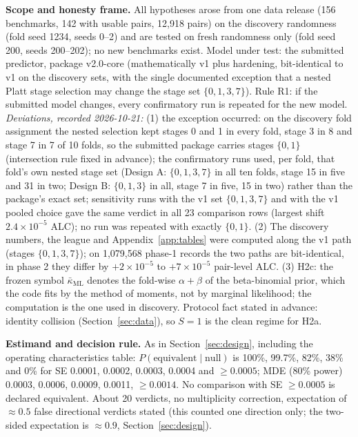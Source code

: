 \documentclass{article}
\begin{document}
\textbf{Scope and honesty frame.} All hypotheses arose from one data release (156 benchmarks, 142 with usable pairs,
12,918 pairs) on the discovery randomness (fold seed 1234, seeds 0--2) and are tested on fresh randomness only (fold
seed 200, seeds 200--202); no new benchmarks exist. Model under test: the submitted predictor, package v2.0-core
(mathematically v1 plus hardening, bit-identical to v1 on the discovery sets, with the single documented exception that
a nested Platt stage selection may change the stage set $\{0, 1, 3, 7\}$). Rule R1: if the submitted model changes,
every confirmatory run is repeated for the new model. \emph{Deviations, recorded 2026-10-21:} (1) the exception
occurred: on the discovery fold assignment the nested selection kept stages 0 and 1 in every fold, stage 3 in 8 and
stage 7 in 7 of 10 folds, so the submitted package carries stages $\{0, 1\}$ (intersection rule fixed in advance); the
confirmatory runs used, per fold, that fold's own nested stage set (Design A: $\{0, 1, 3, 7\}$ in all ten folds, stage
15 in five and 31 in two; Design B: $\{0, 1, 3\}$ in all, stage 7 in five, 15 in two) rather than the package's exact
set; sensitivity runs with the v1 set $\{0, 1, 3, 7\}$ and with the v1 pooled choice gave the same verdict in all 23
comparison rows (largest shift $2.4 \times 10^{-5}$ ALC); no run was repeated with exactly $\{0, 1\}$. (2) The discovery
numbers, the league and Appendix~\ref{app:tables} were computed along the v1 path (stages $\{0, 1, 3, 7\}$); on 1,079,568
phase-1 records the two paths are bit-identical, in phase 2 they differ by $+2 \times 10^{-5}$ to $+7 \times 10^{-5}$
pair-level ALC. (3) H2c: the frozen symbol $\bar\kappa_{\mathrm{ML}}$ denotes the fold-wise $\alpha + \beta$ of the
beta-binomial prior, which the code fits by the method of moments, not by marginal likelihood; the computation is the
one used in discovery. Protocol fact stated in advance:
identity collision (Section~\ref{sec:data}), so $S = 1$ is the clean regime for H2a.

\textbf{Estimand and decision rule.} As in Section~\ref{sec:design}, including the operating characteristics table:
$P(\text{equivalent} \mid \text{null})$ is 100\%, 99.7\%, 82\%, 38\% and 0\% for SE 0.0001, 0.0002, 0.0003, 0.0004 and
$\ge 0.0005$; MDE (80\% power) 0.0003, 0.0006, 0.0009, 0.0011, $\ge 0.0014$. No comparison with SE $\ge 0.0005$ is declared
equivalent. About 20 verdicts, no multiplicity correction, expectation of $\approx 0.5$ false directional verdicts
stated (this counted one direction only; the two-sided expectation is $\approx 0.9$, Section~\ref{sec:design}).
\end{document}
